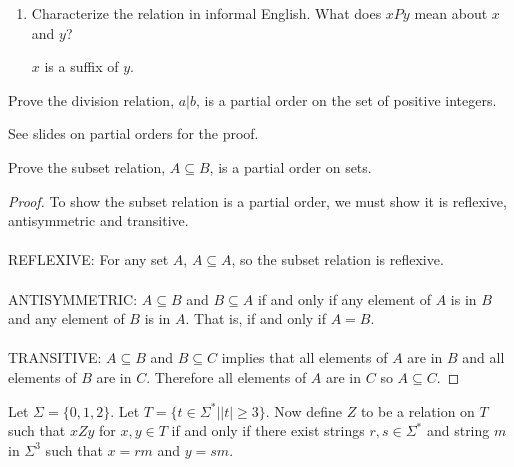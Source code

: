 \documentclass[]{exam}
\begin{document}
\begin{questions}
\begin{enumerate}[label=\alph*)]
\item Characterize the relation in informal English. What does $xPy$ mean about $x$
and $y$?\\
\begin{solution}
$x$ is a suffix of $y$.
\end{solution}

\end{enumerate}
\question Prove the division relation, $a | b$, is a partial order on the set
of positive integers. 
\begin{solution}
See slides on partial orders for the proof.
\end{solution}

\question Prove the subset relation, $A \subseteq B$, is a partial order on
sets. 
\begin{solution}
\begin{proof}
To show the subset relation is a partial order, we must show it is reflexive, 
antisymmetric and transitive.
\\~\\
REFLEXIVE: For any set $A$, $A \subseteq A$, so the subset relation is
reflexive.
\\~\\
ANTISYMMETRIC: $A \subseteq B$ and $B \subseteq A$ if and only if any element
of $A$ is in $B$ and any element of $B$ is in $A$. That is, if and only if 
$A = B$. 
\\~\\
TRANSITIVE: $A \subseteq B$ and $B \subseteq C$ implies that all elements of $A$
are in $B$ and all elements of $B$ are in $C$. Therefore all elements of $A$ are
in $C$ so $A \subseteq C$.
\end{proof}
\end{solution}

\question 
Let $\Sigma = \{0,1,2\}$.  Let $T = \{t \in \Sigma^* | |t| \geq 3\}$.
Now define $Z$ to be a relation on $T$ such that $xZy$ for $x,y \in
T$ if and only if there exist strings $r,s \in \Sigma^*$
and string $m$ in $\Sigma^3$ such that $x = rm$ and $y = sm$. 


\end{questions}
\end{document}
